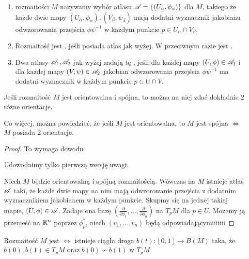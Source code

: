 \begin{definition}$ $
  \begin{enumerate}
    \item {} rozmaitości $M$ nazywamy wybór atlasu $\mathcal{A}=\{(U_\alpha,\phi_\alpha)\}$ dla $M$, takiego że każde dwie mapy $(U_\alpha,\phi_\alpha),(V_\beta,\psi_\beta)$ mają dodatni wyznacznik jakobianu odwzorowania przejścia $\phi\psi^{-1}$ w każdym punkcie $p\in U_\alpha\cap V_\beta$.
    \item Rozmaitość jest , jeśli posiada atlas jak wyżej. W przeciwnym razie jest .
    \item Dwa atlasy $\mathcal{A}_1,\mathcal{A}_2$ jak wyżej zadają tę , jeśli dla każdej mapy $(U,\phi)\in \mathcal{A}_1$ i dla każdej mapy $(V,\psi)\in\mathcal{A}_2$ jakobian odwzorowania przejścia $\phi\psi^{-1}$ ma dodatni wyznacznik w każdym punkcie $p\in U\cap V$.
  \end{enumerate}
\end{definition}

\begin{remark}
  Jeśli rozmaitość $M$ jest orientowalna i spójna, to można na niej zdać dokładnie $2$ różne orientacje. 

  Co więcej, można powiedzieć, że jeśli $M$ jest orientowalna, to $M$ jest spójna $\iff$ $M$ posiada 2 orientacje.
\end{remark}

\begin{proof}{\color{red}\large To wymaga dowodu}
%
%
%
%

  Udowodnimy tylko pierwszą wersję uwagi.

  Niech $M$ będzie orientowalną i spójną rozmaitością. Wówczas na $M$ istnieje atlas $\mathcal{A}$ taki, że każde dwie mapy na nim mają odwzorowanie przejścia z dodatnim wyznacznikiem jakobianem w każdym punkcie. Skupmy się na jednej takiej mapie, $(U,\phi)\in\mathcal{A}$. Zadaje ona bazę $\left(\frac{\partial}{\partial\phi_1},...,\frac{\partial}{\partial\phi_n}\right)$ na $T_pM$ dla $p\in U$. Możemy ją przenieść na $\mathbb{R}^n$ poprzez $\phi^*_p$, niech $(v_1,...,v_n)$ będą odpowiadającymiiiiiii
\end{proof}

\begin{fact}
  Rozmaitość $M$ jest  $\iff$ istnieje ciągła droga $b(t):[0,1]\to B(M)$ taka, że $b(0),b(1)\in T_pM$ oraz $b(0)\not\sim b(1)$ w $T_pM$.
\end{fact}
